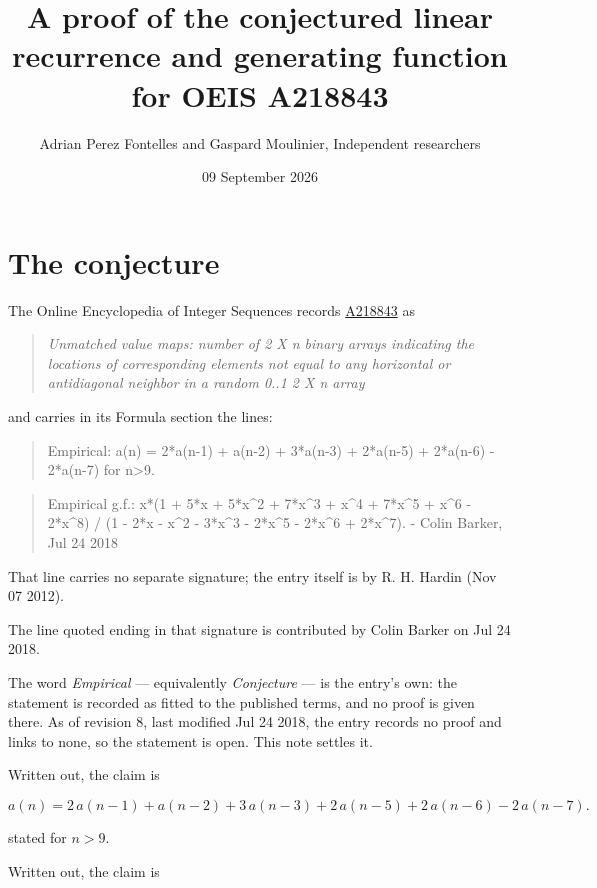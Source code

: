 \documentclass[11pt]{article}
\title{A proof of the conjectured linear recurrence and generating function for OEIS A218843}
\author{Adrian Perez Fontelles and Gaspard Moulinier, Independent researchers}
\date{09 September 2026}
\theoremstyle{definition}
\begin{document}
\maketitle
\section{The conjecture}

The Online Encyclopedia of Integer Sequences records \href{https://oeis.org/A218843}{A218843} as

\begin{quote}\itshape Unmatched value maps: number of 2 X n binary arrays indicating the locations of corresponding elements not equal to any horizontal or antidiagonal neighbor in a random 0..1 2 X n array\end{quote}

and carries in its Formula section the lines:

\begin{quote}\ttfamily Empirical: a(n) = 2*a(n-1) + a(n-2) + 3*a(n-3) + 2*a(n-5) + 2*a(n-6) - 2*a(n-7) for n>9.\end{quote}

\begin{quote}\ttfamily Empirical g.f.: x*(1 + 5*x + 5*x\textasciicircum{}2 + 7*x\textasciicircum{}3 + x\textasciicircum{}4 + 7*x\textasciicircum{}5 + x\textasciicircum{}6 - 2*x\textasciicircum{}8) / (1 - 2*x - x\textasciicircum{}2 - 3*x\textasciicircum{}3 - 2*x\textasciicircum{}5 - 2*x\textasciicircum{}6 + 2*x\textasciicircum{}7). - Colin Barker, Jul 24 2018\end{quote}

That line carries no separate signature; the entry itself is by R. H. Hardin (Nov 07 2012).

The line quoted ending in that signature is contributed by Colin Barker on Jul 24 2018.

The word {\itshape Empirical} --- equivalently {\itshape Conjecture} --- is the entry's own: the statement is recorded as fitted to the published terms, and no proof is given there. As of revision 8, last modified Jul 24 2018, the entry records no proof and links to none, so the statement is open. This note settles it.

Written out, the claim is

\[a(n) = 2\,a(n-1) + a(n-2) + 3\,a(n-3) + 2\,a(n-5) + 2\,a(n-6) - 2\,a(n-7).\]

stated for $n > 9$.

Written out, the claim is
\end{document}
